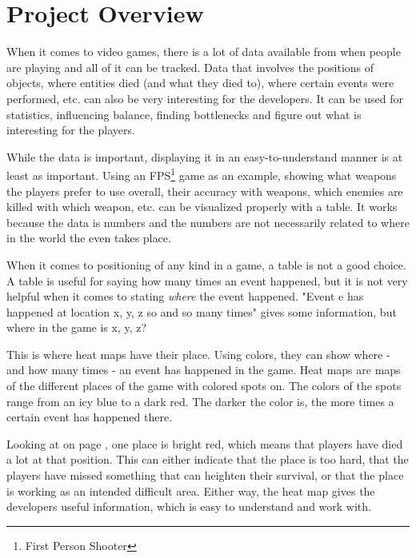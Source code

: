 \section{Project Overview}
\label{Project}

When it comes to video games, there is a lot of data available from when people are playing and all of it can be tracked. Data that involves the positions of objects, where entities died (and what they died to), where certain events were performed, etc. can also be very interesting for the developers. It can be used for statistics, influencing balance, finding bottlenecks and figure out what is interesting for the players.

While the data is important, displaying it in an easy-to-understand manner is at least as important. Using an FPS\footnote{First Person Shooter} game as an example, showing what weapons the players prefer to use overall, their accuracy with weapons, which enemies are killed with which weapon, etc. can be visualized properly with a table. It works because the data is numbers and the numbers are not necessarily related to where in the world the even takes place.

When it comes to positioning of any kind in a game, a table is not a good choice. A table is useful for saying how many times an event happened, but it is not very helpful when it comes to stating \textit{where} the event happened. "Event e has happened at location x, y, z so and so many times" gives some information, but where in the game is x, y, z?


This is where heat maps have their place. Using colors, they can show where - and how many times - an event has happened in the game. Heat maps are maps of the different places of the game with colored spots on. The colors of the spots range from an icy blue to a dark red. The darker the color is, the more times a certain event has happened there.

Looking at  on page \pageref{fig:HL_2_HeatMap}, one place is bright red, which means that players have died a lot at that position. This can either indicate that the place is too hard, that the players have missed something that can heighten their survival, or that the place is working as an intended difficult area. Either way, the heat map gives the developers useful information, which is easy to understand and work with.

